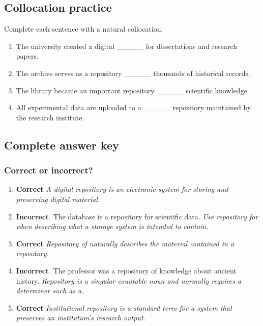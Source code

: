 \documentclass[11pt]{article}
\begin{document}
\subsection{Collocation practice}
Complete each sentence with a natural collocation.

\begin{enumerate}
  \item The university created a digital \_\_\_\_\_ for dissertations and research papers.
  \item The archive serves as a repository \_\_\_\_\_ thousands of historical records.
  \item The library became an important repository \_\_\_\_\_ scientific knowledge.
  \item All experimental data are uploaded to a \_\_\_\_\_ repository maintained by the research institute.
\end{enumerate}

\subsection{Complete answer key}
\subsubsection{Correct or incorrect?}
\begin{enumerate}
  \item \textbf{Correct} \emph{A digital repository is an electronic system for storing and preserving digital material.}
  \item \textbf{Incorrect}. The database is a repository for scientific data. \emph{Use repository for when describing what a storage system is intended to contain.}
  \item \textbf{Correct} \emph{Repository of naturally describes the material contained in a repository.}
  \item \textbf{Incorrect}. The professor was a repository of knowledge about ancient history. \emph{Repository is a singular countable noun and normally requires a determiner such as a.}
  \item \textbf{Correct} \emph{Institutional repository is a standard term for a system that preserves an institution's research output.}
\end{enumerate}
\end{document}

